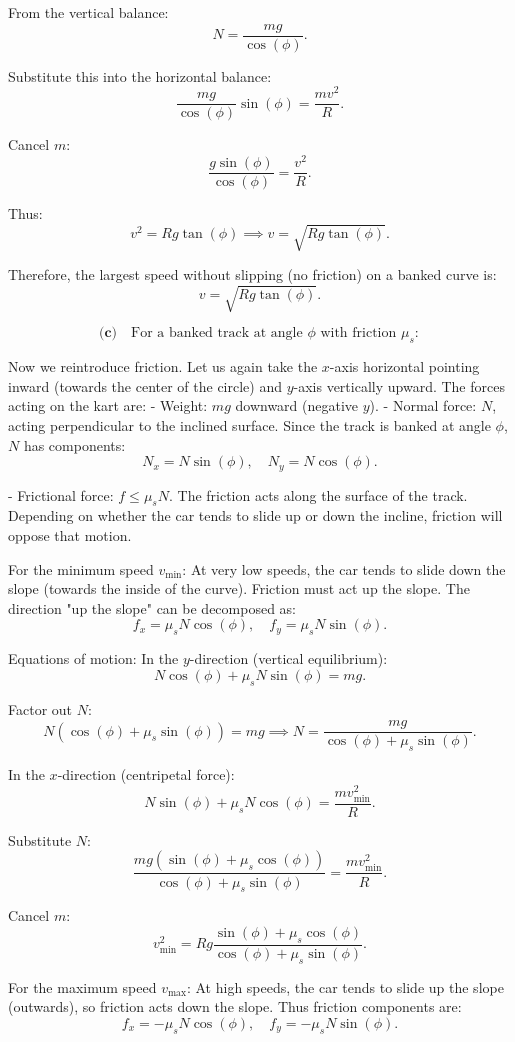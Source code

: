 \documentclass{article}
\begin{document}
From the vertical balance:
\[
N = \frac{mg}{\cos(\phi)}.
\]

Substitute this into the horizontal balance:
\[
\frac{mg}{\cos(\phi)} \sin(\phi) = \frac{mv^2}{R}.
\]

Cancel $m$:
\[
\frac{g \sin(\phi)}{\cos(\phi)} = \frac{v^2}{R}.
\]

Thus:
\[
v^2 = R g \tan(\phi) \implies v = \sqrt{R g \tan(\phi)}.
\]

Therefore, the largest speed without slipping (no friction) on a banked curve is:
\[
\boxed{v = \sqrt{R g \tan(\phi)}.}
\]

\[
\textbf{(c)} \quad \text{For a banked track at angle } \phi \text{ with friction } \mu_s:
\]

Now we reintroduce friction. Let us again take the $x$-axis horizontal pointing inward (towards the center of the circle) and $y$-axis vertically upward. The forces acting on the kart are:
- Weight: $mg$ downward (negative $y$).
- Normal force: $N$, acting perpendicular to the inclined surface. Since the track is banked at angle $\phi$, $N$ has components:
  \[
  N_x = N \sin(\phi), \quad N_y = N \cos(\phi).
  \]

- Frictional force: $f \leq \mu_s N$. The friction acts along the surface of the track. Depending on whether the car tends to slide up or down the incline, friction will oppose that motion.
  
For the minimum speed $v_{\text{min}}$: At very low speeds, the car tends to slide down the slope (towards the inside of the curve). Friction must act up the slope. The direction "up the slope" can be decomposed as:
\[
f_x = \mu_s N \cos(\phi), \quad f_y = \mu_s N \sin(\phi).
\]

Equations of motion:
In the $y$-direction (vertical equilibrium):
\[
N \cos(\phi) + \mu_s N \sin(\phi) = mg.
\]

Factor out $N$:
\[
N(\cos(\phi) + \mu_s \sin(\phi)) = mg \implies N = \frac{mg}{\cos(\phi) + \mu_s \sin(\phi)}.
\]

In the $x$-direction (centripetal force):
\[
N \sin(\phi) + \mu_s N \cos(\phi) = \frac{mv_{\text{min}}^2}{R}.
\]

Substitute $N$:
\[
\frac{mg(\sin(\phi) + \mu_s \cos(\phi))}{\cos(\phi) + \mu_s \sin(\phi)} = \frac{mv_{\text{min}}^2}{R}.
\]

Cancel $m$:
\[
v_{\text{min}}^2 = R g \frac{\sin(\phi) + \mu_s \cos(\phi)}{\cos(\phi) + \mu_s \sin(\phi)}.
\]

For the maximum speed $v_{\text{max}}$: At high speeds, the car tends to slide up the slope (outwards), so friction acts down the slope. Thus friction components are:
\[
f_x = -\mu_s N \cos(\phi), \quad f_y = -\mu_s N \sin(\phi).
\]
\end{document}

